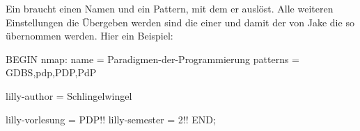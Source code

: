 Ein  braucht einen Namen und ein Pattern, mit dem er auslöst. Alle weiteren Einstellungen die Übergeben werden sind die einer  und damit der  von Jake die so übernommen werden. Hier ein Beispiel:
\begin{gepard}
BEGIN nmap:
    name            = Paradigmen-der-Programmierung
    patterns        = GDBS,pdp,PDP,PdP

    lilly-author    = Schlingelwingel
    
    lilly-vorlesung = PDP!!
    lilly-semester  = 2!!
END;
\end{gepard}